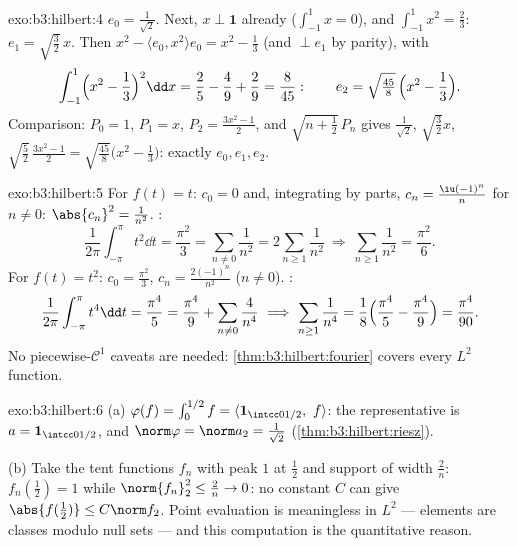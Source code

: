 \begin{solution}{exo:b3:hilbert:4}
$e_0 = \frac1{\sqrt2}$. Next, $x \perp \mathbf 1$ already
($\int_{-1}^1x = 0$), and $\int_{-1}^1x^2 = \frac23$: $e_1 =
\sqrt{\tfrac32}\,x$. Then $x^2 - \langle e_0, x^2\rangle e_0 =
x^2 - \frac13$ (and $\perp e_1$ by parity), with
\[
\int_{-1}^1\Bigl(x^2 - \frac13\Bigr)^2\dd x = \frac25 -
\frac49 + \frac29 = \frac{8}{45}:
\qquad e_2 = \sqrt{\tfrac{45}8}\,\Bigl(x^2 - \frac13\Bigr).
\]
Comparison: $P_0 = 1$, $P_1 = x$, $P_2 = \frac{3x^2 - 1}2$, and
$\sqrt{n + \tfrac12}\,P_n$ gives $\frac1{\sqrt2}$,
$\sqrt{\frac32}x$, $\sqrt{\frac52}\,\frac{3x^2-1}2 =
\sqrt{\frac{45}8}\bigl(x^2 - \frac13\bigr)$: exactly $e_0, e_1,
e_2$.
\end{solution}

\begin{solution}{exo:b3:hilbert:5}
For $f(t) = t$: $c_0 = 0$ and, integrating by parts, $c_n =
\frac{\iu(-1)^n}{n}$ for $n \neq 0$: $\abs{c_n}^2 =
\frac1{n^2}$. :
\[
\frac1{2\pi}\int_{-\pi}^\pi t^2\dd t = \frac{\pi^2}3
= \sum_{n\neq0}\frac1{n^2} = 2\sum_{n\geq1}\frac1{n^2}
\ \Longrightarrow\ \sum_{n\geq1}\frac1{n^2} = \frac{\pi^2}6 .
\]
For $f(t) = t^2$: $c_0 = \frac{\pi^2}3$, $c_n =
\frac{2(-1)^n}{n^2}$ ($n \ne 0$). :
\[
\frac1{2\pi}\int_{-\pi}^{\pi}t^4\dd t = \frac{\pi^4}5
= \frac{\pi^4}9 + \sum_{n\neq0}\frac4{n^4}
\ \Longrightarrow\
\sum_{n\geq1}\frac1{n^4} = \frac18\Bigl(\frac{\pi^4}5 -
\frac{\pi^4}9\Bigr) = \frac{\pi^4}{90} .
\]
No piecewise-$\mathcal C^1$ caveats are needed:
\cref{thm:b3:hilbert:fourier} covers every $L^2$ function.
\end{solution}

\begin{solution}{exo:b3:hilbert:6}
(a) $\varphi(f) = \int_0^{1/2}f = \langle\mathbf
1_{\intcc0{1/2}},\ f\rangle$: the representative is $a =
\mathbf 1_{\intcc0{1/2}}$, and $\norm\varphi = \norm a_2 =
\frac1{\sqrt2}$ (\cref{thm:b3:hilbert:riesz}).

(b) Take the tent functions $f_n$ with peak $1$ at
$\frac12$ and support of width $\frac2n$: $f_n(\tfrac12) = 1$
while $\norm{f_n}_2^2 \leq \frac2n \to 0$: no constant $C$
can give $\abs{f(\frac12)} \leq C\norm f_2$. Point evaluation
is meaningless in $L^2$ --- elements are classes modulo null
sets --- and this computation is the quantitative reason.
\end{solution}

